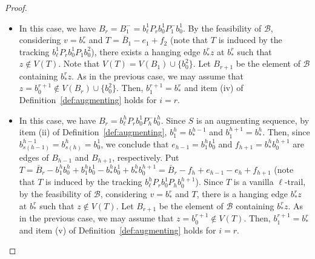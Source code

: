 \documentclass[12pt,reqno,a4paper]{amsart}
\newcommand{\B}{\mathcal{B}}
\begin{document}
\begin{proof}
\begin{itemize}
\item[(b)]  
	In this case, we have \(B_r = B_1^-=b^1_\ell P_r b^1_0 P_1^-b_0^1\).
	By the feasibility of \(\B\), considering
	\(v=b_{*}^r\) and \(T=\bar B_1 - e_1 + f_2\)
	(note that \(T\) is induced by the tracking \(b_\ell^1P_rb_0^1P_1b_0^2\)), 
	there exists a hanging edge \(b_{*}^rz\) at \(b_{*}^r\) such 
that \(z\notin V(T)\).
	Note that \(V(T) = V(B_1)\cup\{b_0^2\}\).
	Let \(B_{r+1}\) be the element of \(\B\) containing 
\(b_{*}^rz\).
	As in the previous case, we may assume that \(z = b_0^{r+1} \notin V(B_r)\cup\{b_0^2\}\).
	Then, \(b_1^{r+1} = b_*^{r}\) and 
	item (iv) of Definition~\ref{def:augmenting} holds for \(i=r\).
	
\item[(c)]
	In this case, we have \(B_r = b_\ell^h P_r b_0^1 P_h^-b_0^h\).	
	Since $S$ is an augmenting sequence, by item (ii) of 
Definition~\ref{def:augmenting}, $b_1^{h}=b^{h-1}_{*}$ 
	and $b_1^{h+1}=b^{h}_{*}$. Then, since 
$b^{h-1}_{s(h-1)}=b^{h}_{s(h)}=b^1_0$, we conclude that 
	$e_{h-1}=b_1^{h}b_0^1$ and $f_{h+1}=b_{*}^{h}b_0^{h+1}$ are edges of 
\(B_{h-1}\) and \(B_{h+1}\), respectively.
	Put \(T = \bar B_r - b_1^{h}b_0^{h} + b_1^{h}b_0^1 
	- b_{*}^{h}b_0^1 + b_{*}^{h}b_0^{h+1} 
	= \bar B_r - f_h + e_{h-1} 
	- e_h + f_{h+1}\)
	(note that \(T\) is induced by the tracking \(b_\ell^hP_rb_0^1P_hb_0^{h+1}\)).
%	
%	
	Since $T$ is a vanilla $\ell$-trail, by the feasibility of \(\B\), considering
	\(v=b_{*}^r\) and \(T\), 
	there is a hanging edge \(b_{*}^rz\) at \(b_{*}^r\) such 
that \(z\notin V(T)\).
	Let \(B_{r+1}\) be the element of \(\B\) containing 
\(b_{*}^rz\).
	As in the previous case, we may assume that \(z = b_0^{r+1} \notin V(T)\).
	Then, \(b_1^{r+1} = b_*^{r}\) and 
	item (v) of Definition~\ref{def:augmenting} holds for \(i=r\).
\end{itemize}


\end{proof}
\end{document}
